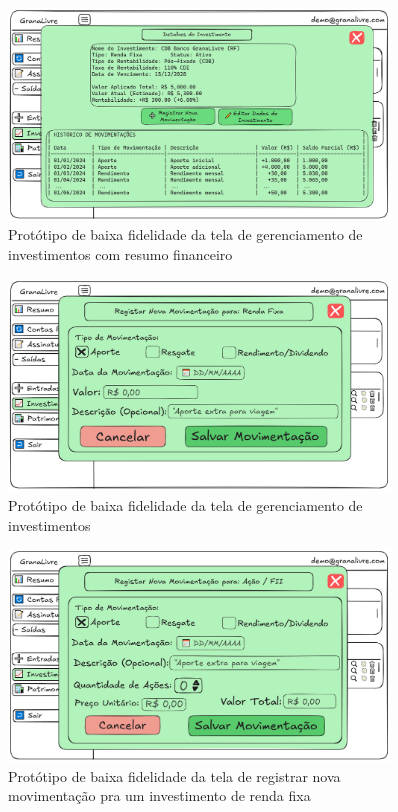 \begin{figure}[H]
    \centering
    \includegraphics[width=0.9\textwidth]{imgs/08-investimentos2.png}
    \caption{Protótipo de baixa fidelidade da tela de gerenciamento de investimentos com resumo financeiro}
    \label{fig:prot_investimentos2}
\end{figure}

\begin{figure}[H]
    \centering
    \includegraphics[width=0.9\textwidth]{imgs/08-investimentos3.png}
    \caption{Protótipo de baixa fidelidade da tela de gerenciamento de investimentos}
    \label{fig:prot_investimentos3}
\end{figure}

\begin{figure}[H]
    \centering
    \includegraphics[width=0.9\textwidth]{imgs/08-investimentos4.png}
    \caption{Protótipo de baixa fidelidade da tela de registrar nova movimentação pra um investimento de renda fixa}
    \label{fig:prot_investimentos4}
\end{figure}

